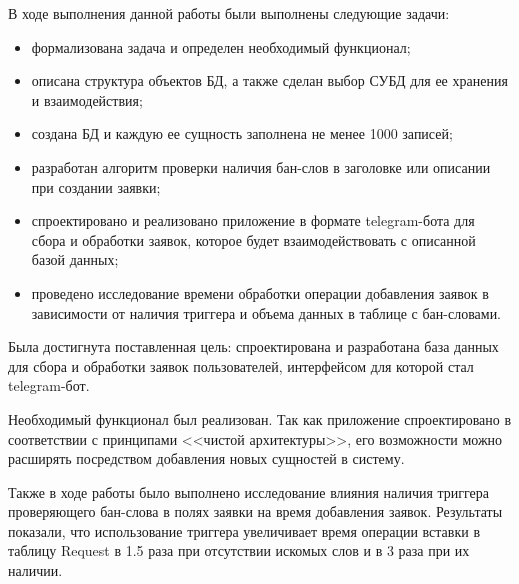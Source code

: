 
В ходе выполнения данной работы были выполнены следующие задачи:
\begin{itemize}
	\item формализована задача и определен необходимый функционал;
	\item описана структура объектов БД, а также сделан выбор СУБД для ее хранения и взаимодействия;
	\item создана БД и каждую ее сущность заполнена не менее 1000 записей;
	\item разработан алгоритм проверки наличия бан-слов в заголовке или описании при создании заявки;
	\item спроектировано и реализовано приложение в формате telegram-бота для сбора и обработки заявок, которое будет взаимодействовать с описанной базой данных;
	\item проведено исследование времени обработки операции добавления заявок в зависимости от наличия триггера и объема данных в таблице с бан-словами.
\end{itemize}

Была достигнута поставленная цель: спроектирована и разработана база данных для сбора и обработки заявок пользователей, интерфейсом для которой стал telegram-бот.

Необходимый функционал был реализован. Так как приложение спроектировано в соответствии с принципами <<чистой архитектуры>>, его возможности можно расширять посредством добавления новых сущностей в систему.

Также в ходе работы было выполнено исследование влияния наличия триггера проверяющего бан-слова в полях заявки на время добавления заявок. Результаты показали, что использование триггера увеличивает время операции вставки в таблицу Request в 1.5 раза при отсутствии искомых слов и в 3 раза при их наличии.
